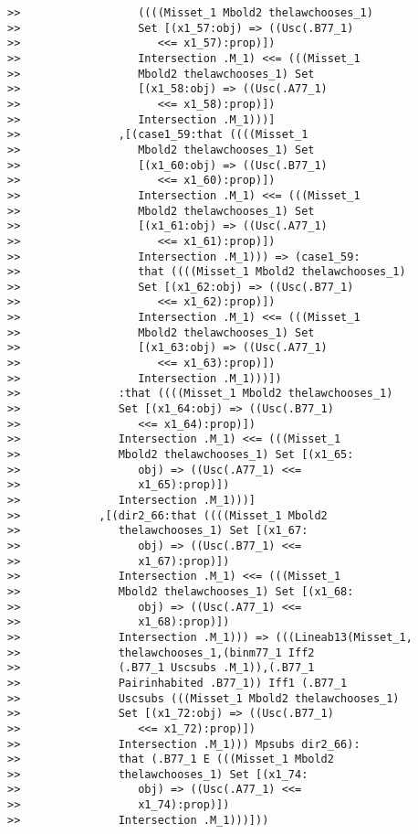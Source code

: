 \documentclass[12pt]{article}
\begin{document}
\begin{verbatim}
>>                  ((((Misset_1 Mbold2 thelawchooses_1)
>>                  Set [(x1_57:obj) => ((Usc(.B77_1)
>>                     <<= x1_57):prop)])
>>                  Intersection .M_1) <<= (((Misset_1
>>                  Mbold2 thelawchooses_1) Set
>>                  [(x1_58:obj) => ((Usc(.A77_1)
>>                     <<= x1_58):prop)])
>>                  Intersection .M_1)))]
>>               ,[(case1_59:that ((((Misset_1
>>                  Mbold2 thelawchooses_1) Set
>>                  [(x1_60:obj) => ((Usc(.B77_1)
>>                     <<= x1_60):prop)])
>>                  Intersection .M_1) <<= (((Misset_1
>>                  Mbold2 thelawchooses_1) Set
>>                  [(x1_61:obj) => ((Usc(.A77_1)
>>                     <<= x1_61):prop)])
>>                  Intersection .M_1))) => (case1_59:
>>                  that ((((Misset_1 Mbold2 thelawchooses_1)
>>                  Set [(x1_62:obj) => ((Usc(.B77_1)
>>                     <<= x1_62):prop)])
>>                  Intersection .M_1) <<= (((Misset_1
>>                  Mbold2 thelawchooses_1) Set
>>                  [(x1_63:obj) => ((Usc(.A77_1)
>>                     <<= x1_63):prop)])
>>                  Intersection .M_1)))])
>>               :that ((((Misset_1 Mbold2 thelawchooses_1)
>>               Set [(x1_64:obj) => ((Usc(.B77_1)
>>                  <<= x1_64):prop)])
>>               Intersection .M_1) <<= (((Misset_1
>>               Mbold2 thelawchooses_1) Set [(x1_65:
>>                  obj) => ((Usc(.A77_1) <<=
>>                  x1_65):prop)])
>>               Intersection .M_1)))]
>>            ,[(dir2_66:that ((((Misset_1 Mbold2
>>               thelawchooses_1) Set [(x1_67:
>>                  obj) => ((Usc(.B77_1) <<=
>>                  x1_67):prop)])
>>               Intersection .M_1) <<= (((Misset_1
>>               Mbold2 thelawchooses_1) Set [(x1_68:
>>                  obj) => ((Usc(.A77_1) <<=
>>                  x1_68):prop)])
>>               Intersection .M_1))) => (((Lineab13(Misset_1,
>>               thelawchooses_1,(binm77_1 Iff2
>>               (.B77_1 Uscsubs .M_1)),(.B77_1
>>               Pairinhabited .B77_1)) Iff1 (.B77_1
>>               Uscsubs (((Misset_1 Mbold2 thelawchooses_1)
>>               Set [(x1_72:obj) => ((Usc(.B77_1)
>>                  <<= x1_72):prop)])
>>               Intersection .M_1))) Mpsubs dir2_66):
>>               that (.B77_1 E (((Misset_1 Mbold2
>>               thelawchooses_1) Set [(x1_74:
>>                  obj) => ((Usc(.A77_1) <<=
>>                  x1_74):prop)])
>>               Intersection .M_1)))]))

\end{verbatim}
\end{document}
